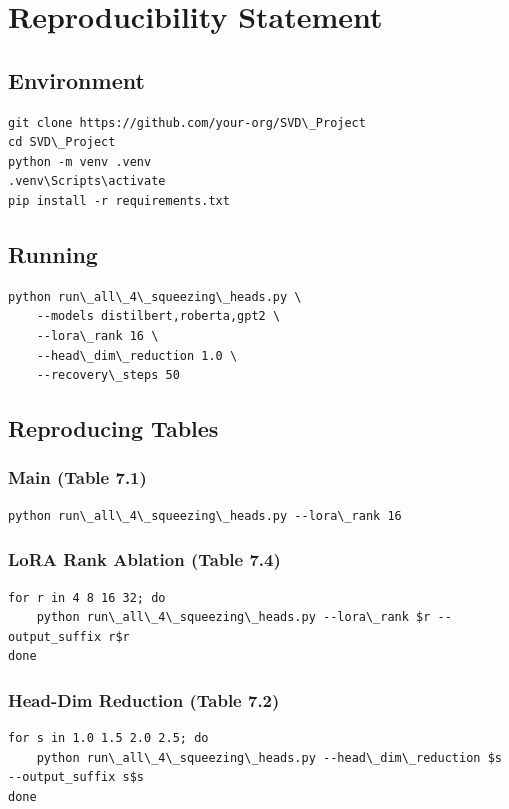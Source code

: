 
\section{Reproducibility Statement}

\subsection{Environment}

\begin{lstlisting}
git clone https://github.com/your-org/SVD\_Project
cd SVD\_Project
python -m venv .venv
.venv\Scripts\activate
pip install -r requirements.txt
\end{lstlisting}

\subsection{Running}

\begin{lstlisting}
python run\_all\_4\_squeezing\_heads.py \
    --models distilbert,roberta,gpt2 \
    --lora\_rank 16 \
    --head\_dim\_reduction 1.0 \
    --recovery\_steps 50
\end{lstlisting}

\subsection{Reproducing Tables}

\subsubsection{Main (Table 7.1)}
\begin{lstlisting}
python run\_all\_4\_squeezing\_heads.py --lora\_rank 16
\end{lstlisting}

\subsubsection{LoRA Rank Ablation (Table 7.4)}
\begin{lstlisting}
for r in 4 8 16 32; do
    python run\_all\_4\_squeezing\_heads.py --lora\_rank $r --output_suffix r$r
done
\end{lstlisting}

\subsubsection{Head-Dim Reduction (Table 7.2)}
\begin{lstlisting}
for s in 1.0 1.5 2.0 2.5; do
    python run\_all\_4\_squeezing\_heads.py --head\_dim\_reduction $s --output_suffix s$s
done
\end{lstlisting}

